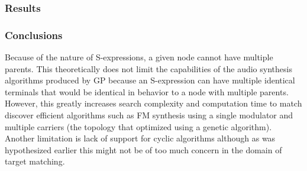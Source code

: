 \documentclass[12pt]{article}
\begin{document}
\subsubsection{Results}\label{TMRESULTS}
\subsubsection{Conclusions}\label{TMCONCLUSIONS}
Because of the nature of S-expressions, a given node cannot have multiple parents. This theoretically does not limit the capabilities of the audio synthesis algorithms produced by GP because an S-expression can have multiple identical terminals that would be identical in behavior to a node with multiple parents. However, this greatly increases search complexity and computation time to match discover efficient algorithms such as FM synthesis using a single modulator and multiple carriers (the topology that \citep{horner1993machine} optimized using a genetic algorithm). Another limitation is lack of support for cyclic algorithms although as was hypothesized earlier this might not be of too much concern in the domain of target matching.
\end{document}
